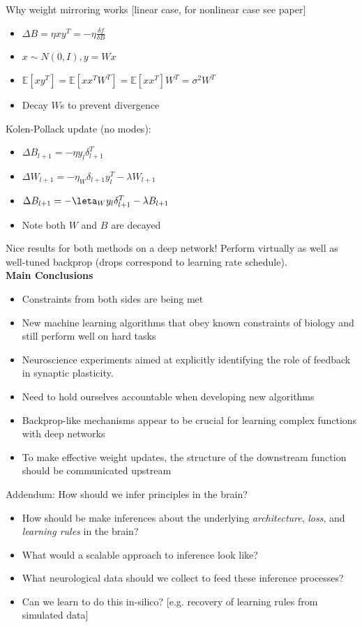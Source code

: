 \documentclass[12pt]{article}
\begin{document}
Why weight mirroring works [linear case, for nonlinear case see paper]
\begin{itemize}
\item $\Delta B = \eta xy^T = -\eta \frac{\delta f}{\delta B}$
\item $x \sim N(0,I), y = Wx$
\item $\mathbb{E}[xy^T] = \mathbb{E}[xx^TW^T] = \mathbb{E}[xx^T]W^T = \sigma^2 W^T$
\item Decay $W$s to prevent divergence
\end{itemize}

Kolen-Pollack update (no modes): 
\begin{itemize}
    \item $\Delta B_{l+1} = -\eta y_l \delta_{l+1}^T$
    \item $\Delta W_{l+1} = -\eta_W \delta_{l+1} y_l^T - \lambda W_{l+1}$
    \item $\Delta B_{l+1} = -\leta_W y_l \delta_{l+1}^T - \lambda B_{l+1}$
    \item Note both $W$ and $B$ are decayed
\end{itemize}

Nice results for both methods on a deep network! Perform virtually as well as well-tuned backprop (drops correspond to learning rate schedule). \\

\textbf{Main Conclusions} 
\begin{itemize}
    \item Constraints from both sides are being met
    \item New machine learning algorithms that obey known constraints of biology and still perform well on hard tasks 
    \item Neuroscience experiments aimed at explicitly identifying the role of feedback in synaptic plasticity.
    \item Need to hold ourselves accountable when developing new algorithms
    \item Backprop-like mechanisms appear to be crucial for learning complex functions with deep networks
    \item To make effective weight updates, the structure of the downstream function should be communicated upstream
\end{itemize}

Addendum: How should we infer principles in the brain?
\begin{itemize}
    \item How should be make inferences about the underlying \textit{architecture}, \textit{loss}, and \textit{learning rules} in the brain?
    \item What would a scalable approach to inference look like?
    \item What neurological data should we collect to feed these inference processes?
    \item Can we learn to do this in-silico? [e.g. recovery of learning rules from simulated data]
\end{itemize}
\end{document}
